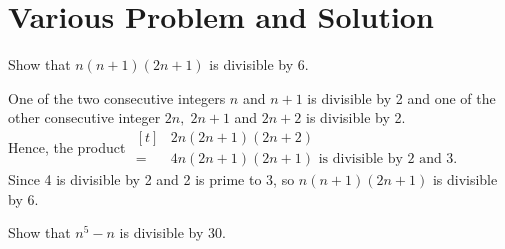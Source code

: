 \documentclass[12pt,class=book,crop=false]{standalone}
\begin{document}
\chapter*{Various Problem and Solution}
\begin{qn}
    Show that $ n (n+1)(2n+1) $ is divisible by $ 6 $.
\end{qn}
\begin{soln}
    One of the two consecutive integers $ n $ and $ n+1 $ is divisible by 2 and one of the other consecutive integer $ 2n,\;2n+1 $ and $ 2n+2 $ is divisible by 2.\\
    Hence, the product $ \begin{aligned}[t]
                & 2n(2n+1)(2n+2)                                  \\
            =\; & 4n(2n+1)(2n+1) \text{ is divisible by 2 and 3.}
        \end{aligned} $ \\
    Since 4 is divisible by 2 and 2 is prime to 3, so $ n (n+1)(2n+1) $ is divisible by $ 6 $.
\end{soln}
\begin{qn}
    Show that $ n^5-n $ is divisible by $ 30 $.
\end{qn}
\end{document}
